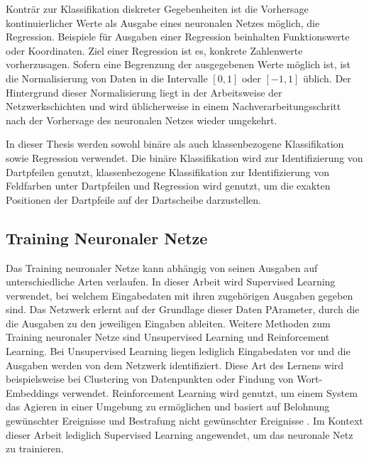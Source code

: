 Konträr zur Klassifikation diskreter Gegebenheiten ist die Vorhersage kontinuierlicher Werte als Ausgabe eines neuronalen Netzes möglich, die Regression. Beispiele für Ausgaben einer Regression beinhalten Funktionswerte oder Koordinaten. Ziel einer Regression ist es, konkrete Zahlenwerte vorherzusagen. Sofern eine Begrenzung der ausgegebenen Werte möglich ist, ist die Normalisierung von Daten in die Intervalle $[0, 1]$ oder $[-1, 1]$ üblich. Der Hintergrund dieser Normalisierung liegt in der Arbeitsweise der Netzwerkschichten und wird üblicherweise in einem Nachverarbeitungsschritt nach der Vorhersage des neuronalen Netzes wieder umgekehrt.

In dieser Thesis werden sowohl binäre als auch klassenbezogene Klassifikation sowie Regression verwendet. Die binäre Klassifikation wird zur Identifizierung von Dartpfeilen genutzt, klassenbezogene Klassifikation zur Identifizierung von Feldfarben unter Dartpfeilen und Regression wird genutzt, um die exakten Positionen der Dartpfeile auf der Dartscheibe darzustellen.


\subsection{Training Neuronaler Netze}
\label{sec:was_nn_training}

Das Training neuronaler Netze kann abhängig von seinen Ausgaben auf unterschiedliche Arten verlaufen. In dieser Arbeit wird Supervised Learning verwendet, bei welchem Eingabedaten mit ihren zugehörigen Ausgaben gegeben sind. Das Netzwerk erlernt auf der Grundlage dieser Daten PArameter, durch die die Ausgaben zu den jeweiligen Eingaben ableiten. Weitere Methoden zum Training neuronaler Netze sind Unsupervised Learning und Reinforcement Learning. Bei Unsupervised Learning liegen lediglich Eingabedaten vor und die Ausgaben werden von dem Netzwerk identifiziert. Diese Art des Lernens wird beispielsweise bei Clustering von Datenpunkten oder Findung von Wort-Embeddings verwendet. Reinforcement Learning wird genutzt, um einem System das Agieren in einer Umgebung zu ermöglichen und basiert auf Belohnung gewünschter Ereignisse und Bestrafung nicht gewünschter Ereignisse \cite{nn_terminology}. Im Kontext dieser Arbeit lediglich Supervised Learning angewendet, um das neuronale Netz zu trainieren.

